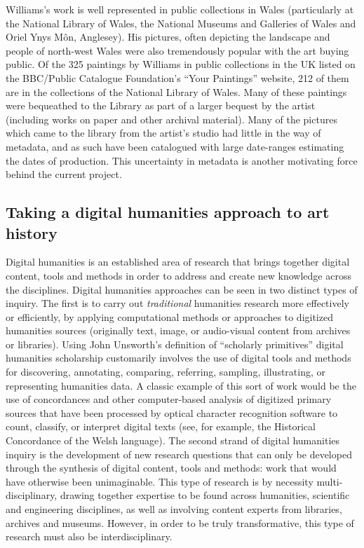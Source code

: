 \documentclass[conference,a4paper]{IEEEtran}
\begin{document}
Williams’s work is well represented in public collections in Wales
(particularly at the National Library of Wales, the National Museums and
Galleries of Wales and Oriel Ynys M\^{o}n, Anglesey). His pictures, often
depicting the landscape and people of north-west Wales were also tremendously
popular with the art buying public. Of the 325 paintings by Williams in public
collections in the UK listed on the BBC/Public Catalogue Foundation's ``Your
Paintings'' website, 212 of them are in the collections of the National Library
of Wales\cite{2013Your}. Many of these paintings were bequeathed to the Library
as part of a larger bequest by the artist (including works on paper and other
archival material). Many of the pictures which came to the library from the
artist’s studio had little in the way of metadata, and as such have been
catalogued with large date-ranges estimating the dates of production.  This
uncertainty in metadata is another motivating force behind the current project.


\subsection{Taking a digital humanities approach to art history}

Digital humanities is an established area of research that brings together
digital content, tools and methods in order to address and create new knowledge
across the disciplines. Digital humanities approaches can be seen in two
distinct types of inquiry. The first is to carry out \emph{traditional}
humanities research more effectively or efficiently, by applying computational
methods or approaches to digitized humanities sources (originally text, image,
or audio-visual content from archives or libraries). Using John Unsworth’s
definition of ``scholarly primitives''\cite{unsworth00} digital humanities
scholarship customarily involves the use of digital tools and methods for
discovering, annotating, comparing, referring, sampling, illustrating, or
representing humanities data. A classic example of this sort of work would be
the use of concordances and other computer-based analysis of digitized primary
sources that have been processed by optical character recognition software to
count, classify, or interpret digital texts (see, for example, the Historical
Concordance of the Welsh language\cite{welshconcordance}).  The second strand
of digital humanities inquiry is the development of new research questions that
can only be developed through the synthesis of digital content, tools and
methods: work that would have otherwise been unimaginable\cite{hughes11}. This
type of research is by necessity multi-disciplinary, drawing together expertise
to be found across humanities, scientific and engineering disciplines, as well
as involving content experts from libraries, archives and museums. However, in
order to be truly transformative, this type of research must also be
interdisciplinary. 
\end{document}
